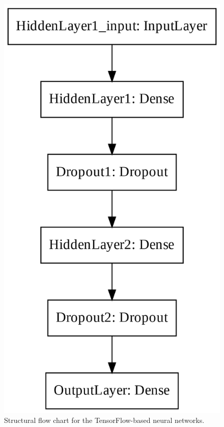 \begin{figure}[!htp]
\centering
\begin{minipage}[b][][b]{.35\linewidth}
    \includegraphics[width=\linewidth]{templates/images/Figure-TF_NN_Structure.png}
    \caption[Neural network structural flow]{Structural flow chart for the TensorFlow-based neural networks.}
    \label{fig:nn_text_structure}

\end{minipage}
\end{figure}
